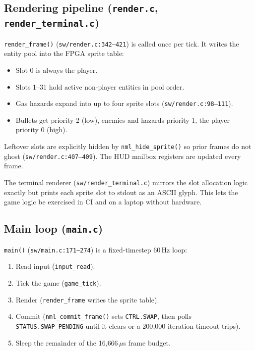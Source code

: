 \documentclass[11pt,letterpaper]{article}
\begin{document}
\subsection{Rendering pipeline (\texttt{render.c}, \texttt{render\_terminal.c})}

\texttt{render\_frame()} (\texttt{sw/render.c:342--421}) is called once per
tick. It writes the entity pool into the FPGA sprite table:

\begin{itemize}[leftmargin=*,nosep]
  \item Slot 0 is always the player.
  \item Slots 1--31 hold active non-player entities in pool order.
  \item Gas hazards expand into up to four sprite slots
    (\texttt{sw/render.c:98--111}).
  \item Bullets get priority 2 (low), enemies and hazards priority 1, the
    player priority 0 (high).
\end{itemize}

Leftover slots are explicitly hidden by \texttt{nml\_hide\_sprite()} so prior
frames do not ghost (\texttt{sw/render.c:407--409}). The HUD mailbox
registers are updated every frame.

The terminal renderer (\texttt{sw/render\_terminal.c}) mirrors the slot
allocation logic exactly but prints each sprite slot to stdout as an ASCII
glyph. This lets the game logic be exercised in CI and on a laptop without
hardware.

\subsection{Main loop (\texttt{main.c})}

\texttt{main()} (\texttt{sw/main.c:171--274}) is a fixed-timestep 60\,Hz loop:

\begin{enumerate}[leftmargin=*,nosep]
  \item Read input (\texttt{input\_read}).
  \item Tick the game (\texttt{game\_tick}).
  \item Render (\texttt{render\_frame} writes the sprite table).
  \item Commit (\texttt{nml\_commit\_frame()} sets \texttt{CTRL.SWAP}, then
    polls \texttt{STATUS.SWAP\_PENDING} until it clears or a 200{,}000-iteration
    timeout trips).
  \item Sleep the remainder of the 16{,}666\,$\mu$s frame budget.
\end{enumerate}
\end{document}
